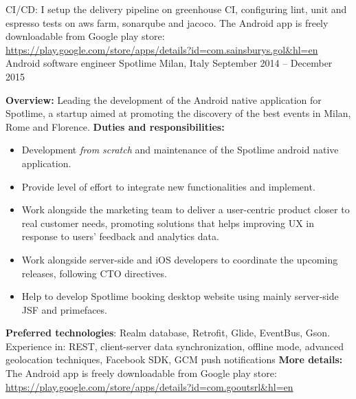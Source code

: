 \begin{cventries}
{CI/CD: I setup the delivery pipeline on greenhouse CI, configuring lint, unit and espresso tests on aws farm, sonarqube and jacoco.
   \newline The Android app is freely downloadable from Google play store:
   \url{https://play.google.com/store/apps/details?id=com.sainsburys.gol&hl=en}
}
\cventry
{Android software engineer}
{Spotlime}
{Milan, Italy}
{September 2014 -- December 2015 }
{
   \textbf{Overview:}
   Leading the 
   development of the 
   Android native application for 
   Spotlime, a startup aimed  at promoting  the 
   discovery of the best events in Milan, Rome and Florence. 
   \newline
   \textbf{Duties and responsibilities:}
   \begin{itemize}
      \item Development \emph{from scratch} and maintenance of the Spotlime android
	 native application.
      \item Provide level of effort to integrate new functionalities and
	implement. 
      \item 
   Work alongside the marketing team to deliver a user-centric product closer
   to real customer 
   needs, promoting solutions that helps improving UX in response
   to users' feedback and analytics data.
      \item 
   Work alongside server-side and iOS developers to coordinate the upcoming
   releases, following CTO directives.
\item Help to develop Spotlime booking desktop website using mainly server-side JSF and
   primefaces.
\end{itemize}
\textbf{Preferred technologies}: Realm database, Retrofit, Glide, EventBus,
Gson.
   Experience in: REST, client-server data synchronization, offline mode,
   advanced geolocation techniques, Facebook SDK, GCM push notifications
   \newline
   \textbf{More details:}
   The Android app is freely downloadable from Google play store: 
   \url{https://play.google.com/store/apps/details?id=com.gooutsrl&hl=en}
}


\end{cventries}
